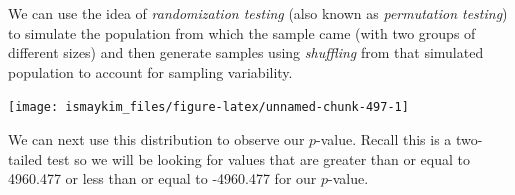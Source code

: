 \documentclass[12pt,]{krantz}
\makeatletter
\newenvironment{Shaded}{\begin{snugshade}}{\end{snugshade}}
\newcommand{\KeywordTok}[1]{\textcolor[rgb]{0.27,0.27,0.27}{\textbf{#1}}}
\newcommand{\DataTypeTok}[1]{\textcolor[rgb]{0.27,0.27,0.27}{#1}}
\newcommand{\DecValTok}[1]{\textcolor[rgb]{0.06,0.06,0.06}{#1}}
\newcommand{\StringTok}[1]{\textcolor[rgb]{0.5,0.5,0.5}{#1}}
\newcommand{\OperatorTok}[1]{\textcolor[rgb]{0.43,0.43,0.43}{\textbf{#1}}}
\newcommand{\NormalTok}[1]{#1}
\newenvironment{kframe}{%
\medskip{}
\setlength{\fboxsep}{.8em}
 \def\at@end@of@kframe{}%
 \ifinner\ifhmode%
  \def\at@end@of@kframe{\end{minipage}}%
  \begin{minipage}{\columnwidth}%
 \fi\fi%
 \def\FrameCommand##1{\hskip\@totalleftmargin \hskip-\fboxsep
 \colorbox{shadecolor}{##1}\hskip-\fboxsep
     \hskip-\linewidth \hskip-\@totalleftmargin \hskip\columnwidth}%
 \MakeFramed {\advance\hsize-\width
   \@totalleftmargin\z@ \linewidth\hsize
   \@setminipage}}%
 {\par\unskip\endMakeFramed%
 \at@end@of@kframe}
\renewenvironment{Shaded}{\begin{kframe}}{\end{kframe}}
\makeatother
\begin{document}
We can use the idea of \emph{randomization testing} (also known as
\emph{permutation testing}) to simulate the population from which the
sample came (with two groups of different sizes) and then generate
samples using \emph{shuffling} from that simulated population to account
for sampling variability.

\begin{Shaded}
\end{Shaded}

\begin{Shaded}
\end{Shaded}

\begin{center}\texttt{[image: ismaykim\_files/figure-latex/unnamed-chunk-497-1]} \end{center}

We can next use this distribution to observe our \(p\)-value. Recall
this is a two-tailed test so we will be looking for values that are
greater than or equal to 4960.477 or less than or equal to -4960.477 for
our \(p\)-value.

\begin{Shaded}
\end{Shaded}
\end{document}
